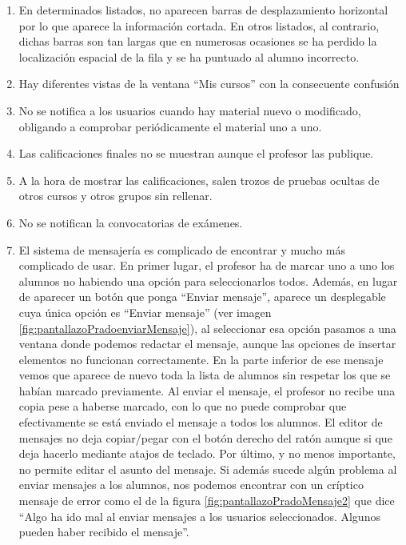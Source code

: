 \begin{enumerate}
\item En determinados listados, no aparecen barras de desplazamiento horizontal por lo que aparece la información cortada. En otros listados, al contrario, dichas barras son tan largas que en numerosas ocasiones se ha perdido la localización espacial de la fila y se ha puntuado al alumno incorrecto.

\item Hay diferentes vistas de la ventana ``Mis cursos'' con la consecuente confusión

\item No se notifica a los usuarios cuando hay material nuevo o modificado, obligando a comprobar periódicamente el material uno a uno.

\item Las calificaciones finales no se muestran aunque el profesor las publique.

\item A la hora de mostrar las calificaciones, salen trozos de pruebas ocultas de otros cursos y otros grupos sin rellenar.

\item No se notifican la convocatorias de exámenes.

\item El sistema de mensajería es complicado de encontrar y mucho más complicado de usar. En primer lugar, el profesor ha de marcar uno a uno los alumnos no habiendo una opción para seleccionarlos todos. Además, en lugar de aparecer un botón que ponga  ``Enviar mensaje'', aparece un desplegable cuya única opción es ``Enviar mensaje'' (ver imagen \ref{fig:pantallazoPradoenviarMensaje}), al seleccionar esa opción pasamos a una ventana donde podemos redactar el mensaje, aunque las opciones de insertar elementos no funcionan correctamente. En la parte inferior de ese mensaje vemos que aparece de nuevo toda la lista de alumnos sin respetar los que se habían marcado previamente. Al enviar el mensaje, el profesor no recibe una copia pese a haberse marcado, con lo que no puede comprobar que efectivamente se está enviado el mensaje a todos los alumnos. El editor de mensajes no deja copiar/pegar con el botón derecho del ratón aunque si que deja hacerlo mediante atajos de teclado. Por último, y no menos importante, no permite editar el asunto del mensaje. Si además sucede algún problema al enviar mensajes a los alumnos, nos podemos encontrar con un críptico mensaje de error como el de la figura \ref{fig:pantallazoPradoMensaje2} que dice  ``Algo ha ido mal al enviar mensajes a los usuarios seleccionados. Algunos pueden haber recibido el mensaje''.



\end{enumerate}
